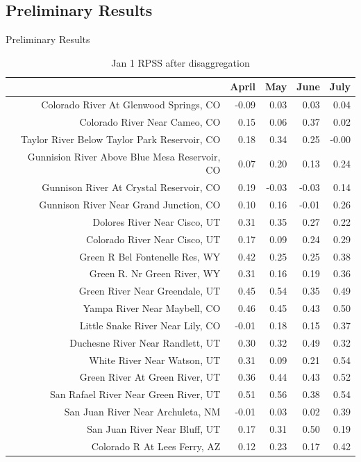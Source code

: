 \documentclass{beamer}
\begin{document}
\subsection{Preliminary Results}
\begin{frame}{Preliminary Results}
\tiny
\begin{table}[!ht]
\begin{center}
\caption{Jan 1 RPSS after disaggregation}
\begin{tabular}{rrrrr}
  \toprule  & April & May & June & July \\ 
  \midrule Colorado River At Glenwood Springs, CO & -0.09 & 0.03 & 0.03 & 0.04 \\ 
  Colorado River Near Cameo, CO & 0.15 & 0.06 & 0.37 & 0.02 \\ 
  Taylor River Below Taylor Park Reservoir, CO & 0.18 & 0.34 & 0.25 & -0.00 \\ 
  Gunnision River Above Blue Mesa Reservoir, CO & 0.07 & 0.20 & 0.13 & 0.24 \\ 
  Gunnison River At Crystal Reservoir, CO & 0.19 & -0.03 & -0.03 & 0.14 \\ 
  Gunnison River Near Grand Junction, CO & 0.10 & 0.16 & -0.01 & 0.26 \\ 
  Dolores River Near Cisco, UT & 0.31 & 0.35 & 0.27 & 0.22 \\ 
  Colorado River Near Cisco, UT & 0.17 & 0.09 & 0.24 & 0.29 \\ 
  Green R Bel Fontenelle Res, WY & 0.42 & 0.25 & 0.25 & 0.38 \\ 
  Green R. Nr Green River, WY & 0.31 & 0.16 & 0.19 & 0.36 \\ 
  Green River Near Greendale, UT & 0.45 & 0.54 & 0.35 & 0.49 \\ 
  Yampa River Near Maybell, CO & 0.46 & 0.45 & 0.43 & 0.50 \\ 
  Little Snake River Near Lily, CO & -0.01 & 0.18 & 0.15 & 0.37 \\ 
  Duchesne River Near Randlett, UT & 0.30 & 0.32 & 0.49 & 0.32 \\ 
  White River Near Watson, UT & 0.31 & 0.09 & 0.21 & 0.54 \\ 
  Green River At Green River, UT & 0.36 & 0.44 & 0.43 & 0.52 \\ 
  San Rafael River Near Green River, UT & 0.51 & 0.56 & 0.38 & 0.54 \\ 
  San Juan River Near Archuleta, NM & -0.01 & 0.03 & 0.02 & 0.39 \\ 
  San Juan River Near Bluff, UT & 0.17 & 0.31 & 0.50 & 0.19 \\ 
  Colorado R At Lees Ferry, AZ & 0.12 & 0.23 & 0.17 & 0.42 \\ 
   \bottomrule \end{tabular}
\end{center}
\end{table}
\end{frame}
\end{document}
